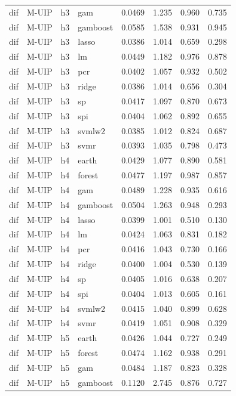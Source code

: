 \begin{ThreePartTable}
\begin{longtable}[t]{llclcccc}
dif & M-UIP & h3 & gam & 0.0469 & 1.235 & 0.960 & 0.735\\
dif & M-UIP & h3 & gamboost & 0.0585 & 1.538 & 0.931 & 0.945\\
dif & M-UIP & h3 & lasso & 0.0386 & 1.014 & 0.659 & 0.298\\
dif & M-UIP & h3 & lm & 0.0449 & 1.182 & 0.976 & 0.878\\
dif & M-UIP & h3 & pcr & 0.0402 & 1.057 & 0.932 & 0.502\\
dif & M-UIP & h3 & ridge & 0.0386 & 1.014 & 0.656 & 0.304\\
dif & M-UIP & h3 & sp & 0.0417 & 1.097 & 0.870 & 0.673\\
dif & M-UIP & h3 & spi & 0.0404 & 1.062 & 0.892 & 0.655\\
dif & M-UIP & h3 & svmlw2 & 0.0385 & 1.012 & 0.824 & 0.687\\
dif & M-UIP & h3 & svmr & 0.0393 & 1.035 & 0.798 & 0.473\\
\addlinespace
dif & M-UIP & h4 & earth & 0.0429 & 1.077 & 0.890 & 0.581\\
dif & M-UIP & h4 & forest & 0.0477 & 1.197 & 0.987 & 0.857\\
dif & M-UIP & h4 & gam & 0.0489 & 1.228 & 0.935 & 0.616\\
dif & M-UIP & h4 & gamboost & 0.0504 & 1.263 & 0.948 & 0.293\\
dif & M-UIP & h4 & lasso & 0.0399 & 1.001 & 0.510 & 0.130\\
dif & M-UIP & h4 & lm & 0.0424 & 1.063 & 0.831 & 0.182\\
dif & M-UIP & h4 & pcr & 0.0416 & 1.043 & 0.730 & 0.166\\
dif & M-UIP & h4 & ridge & 0.0400 & 1.004 & 0.530 & 0.139\\
dif & M-UIP & h4 & sp & 0.0405 & 1.016 & 0.638 & 0.207\\
dif & M-UIP & h4 & spi & 0.0404 & 1.013 & 0.605 & 0.161\\
dif & M-UIP & h4 & svmlw2 & 0.0415 & 1.040 & 0.899 & 0.628\\
dif & M-UIP & h4 & svmr & 0.0419 & 1.051 & 0.908 & 0.329\\
\addlinespace
dif & M-UIP & h5 & earth & 0.0426 & 1.044 & 0.727 & 0.249\\
dif & M-UIP & h5 & forest & 0.0474 & 1.162 & 0.938 & 0.291\\
dif & M-UIP & h5 & gam & 0.0484 & 1.187 & 0.823 & 0.328\\
dif & M-UIP & h5 & gamboost & 0.1120 & 2.745 & 0.876 & 0.727\\

\end{longtable}
\end{ThreePartTable}
